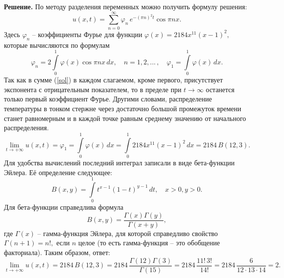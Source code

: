 \documentclass[12pt]{article}
\begin{document}
\noindent\textbf{Решение.} 
По методу разделения переменных можно получить формулу решения:
\begin{equation}\label{sol}
    u(x,t) = \sum\limits_{n=0}^{\infty} \varphi_n\, e^{-(\pi n)^2t} \cos{\pi nx}.
\end{equation}
Здесь $\varphi_n$ -- коэффициенты Фурье для функции $\varphi(x) = 2184x^{11}(x-1)^2,$ которые вычисляются по формулам
\begin{equation*}
    \varphi_n = 2\int\limits_0^1 \varphi(x) \cos{\pi nx}\, dx, \quad n = 1, 2, ...\,, \quad \varphi_1 = \int\limits_0^1 \varphi(x)\,dx.
\end{equation*}
Так как в сумме (\ref{sol}) в каждом слагаемом, кроме первого, присутствует экспонента с отрицательным показателем, то в пределе при $t\to\infty$ останется только первый коэффициент Фурье. Другими словами, распределение температуры в тонком стержне через достаточно большой промежуток времени станет равномерным и в каждой точке равным среднему значению от начального распределения.
\begin{equation*}
    \lim_{t\to +\infty} u(x,t) = \varphi_1 = \int\limits_0^1 \varphi(x)\,dx = \int\limits_0^1 2184x^{11}(x-1)^2\,dx = 2184\,B(12,3).
\end{equation*}
Для удобства вычислений последний интеграл записали в виде бета-функции Эйлера. Её определение следующее:
\begin{equation*}
    B(x,y) = \int\limits_0^1 t^{x-1} (1-t)^{y-1}\,dt, \quad x > 0, y > 0.
\end{equation*}
Для бета-функции справедлива формула
\begin{equation*}
    B(x,y) = \frac{\Gamma(x)\Gamma(y)}{\Gamma(x+y)},
\end{equation*}
где $\Gamma(x)$ -- гамма-функция Эйлера, для которой справедливо свойство $\Gamma(n + 1) = n!,$ если $n$ целое (то есть гамма-функция -- это обобщение факториала). Таким образом, ответ:
\begin{equation*}
    \lim_{t\to +\infty} u(x,t) = 2184\,  B(12,3) = 2184\, \frac{\Gamma(12)\Gamma(3)}{\Gamma(15)} = 2184\, \frac{11!\,3!}{14!} = 2184\,\frac{6}{12\cdot 13\cdot 14} = 2.
\end{equation*}
\end{document}
